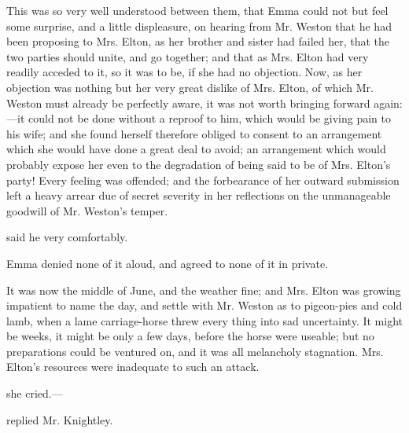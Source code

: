 This was so very well understood between them, that Emma could not but feel some surprise, and a little displeasure, on hearing from Mr. Weston that he had been proposing to Mrs. Elton, as her brother and sister had failed her, that the two parties should unite, and go together; and that as Mrs. Elton had very readily acceded to it, so it was to be, if she had no objection. Now, as her objection was nothing but her very great dislike of Mrs. Elton, of which Mr. Weston must already be perfectly aware, it was not worth bringing forward again:---it could not be done without a reproof to him, which would be giving pain to his wife; and she found herself therefore obliged to consent to an arrangement which she would have done a great deal to avoid; an arrangement which would probably expose her even to the degradation of being said to be of Mrs. Elton's party! Every feeling was offended; and the forbearance of her outward submission left a heavy arrear due of secret severity in her reflections on the unmanageable goodwill of Mr. Weston's temper.

 said he very comfortably. 

Emma denied none of it aloud, and agreed to none of it in private.

It was now the middle of June, and the weather fine; and Mrs. Elton was growing impatient to name the day, and settle with Mr. Weston as to pigeon-pies and cold lamb, when a lame carriage-horse threw every thing into sad uncertainty. It might be weeks, it might be only a few days, before the horse were useable; but no preparations could be ventured on, and it was all melancholy stagnation. Mrs. Elton's resources were inadequate to such an attack.

 she cried.---

 replied Mr. Knightley. 

